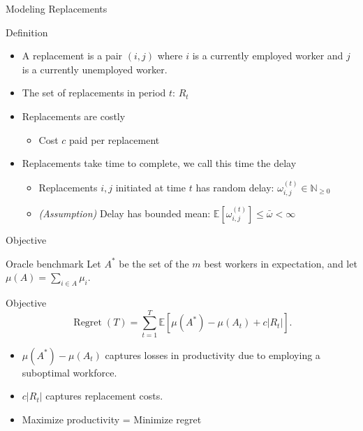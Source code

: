 \documentclass[10pt,aspectratio=169]{beamer}
\newcommand{\bE}[1]{{\mathbb{E}\left[#1\right]}}
\newcommand{\Regret}{\operatorname{Regret}}
\begin{document}
\begin{frame}{Modeling Replacements}
    \begin{block}{Definition}
        \begin{itemize}
            \item A \alert{replacement} is a pair \((i,j)\) where \(i\) is a currently employed worker and \(j\) is a currently unemployed worker.
            \item The set of replacements in period \(t\): \(R_t\)
        \end{itemize}
        
    \end{block}

    \vspace{0.5em}
    \begin{itemize}
        \item Replacements are \alert{costly}
            \begin{itemize}
                \item Cost \(c\) paid per replacement
            \end{itemize}
        \item Replacements take time to complete, we call this time the \alert{delay} 
        \begin{itemize}
            \item Replacements \(i,j\) initiated at time \(t\) has random delay: \(\omega_{i,j}^{(t)}\in \mathbb{N}_{\geq 0}\)
            \item \emph{(Assumption)} Delay has bounded mean: \(\bE{\omega_{i,j}^{(t)}}\leq \bar{\omega}<\infty\)
        \end{itemize}
    \end{itemize}
\end{frame}

\begin{frame}{Objective}
\begin{block}{Oracle benchmark}
Let \(A^*\) be the set of the \(m\) best workers in expectation, and let \(\mu(A)=\sum_{i\in A}\mu_i\).
\end{block}

\begin{block}{Objective}
\[
\Regret(T)=\sum_{t=1}^T \bE{\mu(A^*)-\mu(A_t)+c|R_t|}.
\]
\end{block}

\begin{itemize}
    \item \(\mu(A^*)-\mu(A_t)\) captures losses in productivity due to employing a suboptimal workforce.
    \item \(c|R_t|\) captures replacement costs.
    \item Maximize productivity = Minimize regret
\end{itemize}
\end{frame}
\end{document}
